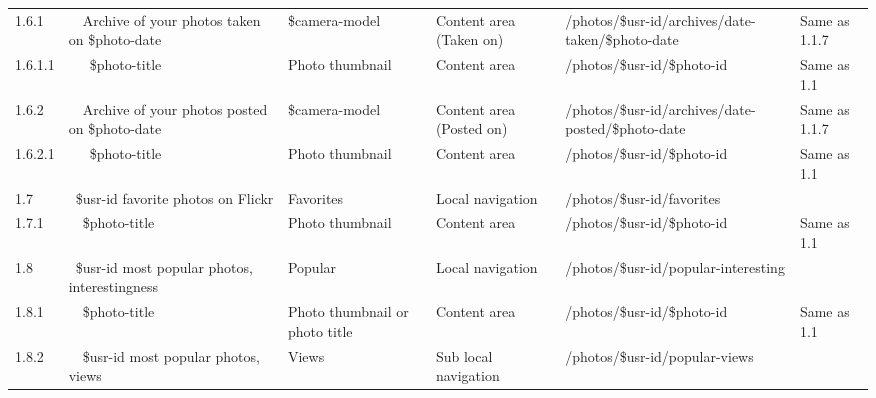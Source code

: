 \documentclass[12pt,a4paper]{article}
\begin{document}
\begin{landscape}
\begin{table}[h!b!p!]
\begin{center}
\begin{tiny}
\begin{tabular}{l|l|l|l|l|p{3cm}}
                1.6.1 &
                ~~Archive of your photos taken on \$photo-date &
                \$camera-model &
                Content area (Taken on) &
                /photos/\$usr-id/archives/date-taken/\$photo-date &
                Same as 1.1.7 \\

                  1.6.1.1 &
                  ~~~\$photo-title &
                  Photo thumbnail &
                  Content area &
                  /photos/\$usr-id/\$photo-id &
                  Same as 1.1 \\

                1.6.2 &
                ~~Archive of your photos posted on \$photo-date &
                \$camera-model &
                Content area (Posted on) &
                /photos/\$usr-id/archives/date-posted/\$photo-date &
                Same as 1.1.7 \\

                  1.6.2.1 &
                  ~~~\$photo-title &
                  Photo thumbnail &
                  Content area &
                  /photos/\$usr-id/\$photo-id &
                  Same as 1.1 \\

              1.7 &
              ~\$usr-id favorite photos on Flickr &
              Favorites &
              Local navigation &
              /photos/\$usr-id/favorites &
              \\

                1.7.1 &
                ~~\$photo-title &
                Photo thumbnail &
                Content area &
                /photos/\$usr-id/\$photo-id &
                Same as 1.1 \\

              1.8 &
              ~\$usr-id most popular photos, interestingness &
              Popular &
              Local navigation &
              /photos/\$usr-id/popular-interesting &
              \\

                1.8.1 &
                ~~\$photo-title &
                Photo thumbnail or photo title &
                Content area &
                /photos/\$usr-id/\$photo-id &
                Same as 1.1 \\

                1.8.2 &
                ~~\$usr-id most popular photos, views &
                Views &
                Sub local navigation &
                /photos/\$usr-id/popular-views &
                \\


\end{tabular}
\end{tiny}
\end{center}
\end{table}
\end{landscape}
\end{document}
